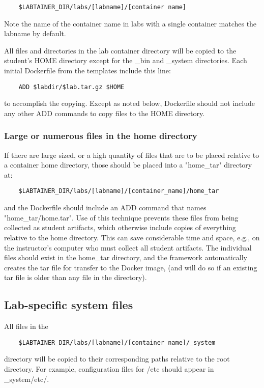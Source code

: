 \documentclass[12pt]{article}
\begin{document}
\begin{verbatim}
    $LABTAINER_DIR/labs/[labname]/[container name]
\end{verbatim}
Note the name of the container name in labs with a single container matches the labname by default.

All files and directories in the lab container directory will be copied to the student's HOME
directory except for the \_bin and \_system directories.
Each initial Dockerfile from the templates include this line:
\begin{verbatim}
    ADD $labdir/$lab.tar.gz $HOME
\end{verbatim}
to accomplish the copying. Except as noted below, Dockerfile should not include any other ADD commands
to copy files to the HOME directory.
\subsubsection{Large or numerous files in the home directory}
If there are large sized, or a high quantity of files that are to be placed relative to a 
container home directory, those should be placed into a "home\_tar" directory at:
\begin{verbatim}
    $LABTAINER_DIR/labs/[labname]/[container_name]/home_tar
\end{verbatim}
\noindent and the Dockerfile should include an ADD command that names "home\_tar/home.tar".
Use of this technique prevents these files from being collected as student artifacts, which
otherwise include copies of everything relative to the home directory.  This
can save considerable time and space, e.g., on the instructor's computer who must collect
all student artifacts.
The individual files should exist in the home\_tar directory, and the framework automatically
creates the tar file for transfer to the Docker image, (and will do so if an existing tar file
is older than any file in the directory).

\subsection{Lab-specific system files}
All files in the
\begin{verbatim}
    $LABTAINER_DIR/labs/[labname]/[container name]/_system
\end{verbatim}
directory will be copied to their corresponding paths relative to the root directory.
For example, configuration files for /etc should appear in \_system/etc/.
\end{document}
